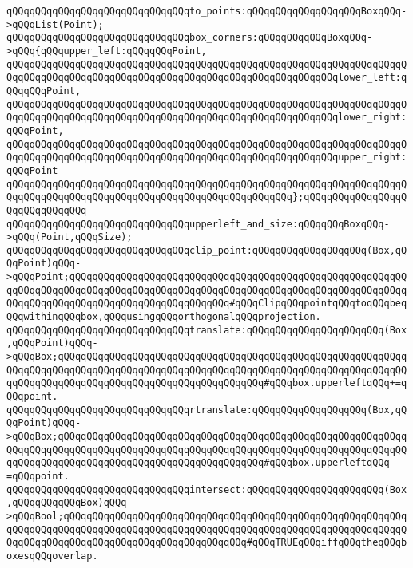 \verb|qQQqqQQqqQQqqQQqqQQqqQQqqQQqqQQqto_points:qQQqqQQqqQQqqQQqqQQqBoxqQQq->qQQqList(Point);|\newline
\verb|qQQqqQQqqQQqqQQqqQQqqQQqqQQqqQQqbox_corners:qQQqqQQqqQQqBoxqQQq->qQQq{qQQqupper_left:qQQqqQQqPoint,|\newline
\verb|qQQqqQQqqQQqqQQqqQQqqQQqqQQqqQQqqQQqqQQqqQQqqQQqqQQqqQQqqQQqqQQqqQQqqQQqqQQqqQQqqQQqqQQqqQQqqQQqqQQqqQQqqQQqqQQqqQQqqQQqqQQqqQQqlower_left:qQQqqQQqPoint,|\newline
\verb|qQQqqQQqqQQqqQQqqQQqqQQqqQQqqQQqqQQqqQQqqQQqqQQqqQQqqQQqqQQqqQQqqQQqqQQqqQQqqQQqqQQqqQQqqQQqqQQqqQQqqQQqqQQqqQQqqQQqqQQqqQQqqQQqlower_right:qQQqPoint,|\newline
\verb|qQQqqQQqqQQqqQQqqQQqqQQqqQQqqQQqqQQqqQQqqQQqqQQqqQQqqQQqqQQqqQQqqQQqqQQqqQQqqQQqqQQqqQQqqQQqqQQqqQQqqQQqqQQqqQQqqQQqqQQqqQQqqQQqupper_right:qQQqPoint|\newline
\verb|qQQqqQQqqQQqqQQqqQQqqQQqqQQqqQQqqQQqqQQqqQQqqQQqqQQqqQQqqQQqqQQqqQQqqQQqqQQqqQQqqQQqqQQqqQQqqQQqqQQqqQQqqQQqqQQqqQQqqQQq};qQQqqQQqqQQqqQQqqQQqqQQqqQQqqQQq|\newline
\verb|qQQqqQQqqQQqqQQqqQQqqQQqqQQqqQQqupperleft_and_size:qQQqqQQqBoxqQQq->qQQq(Point,qQQqSize);|\newline
\newline
\verb|qQQqqQQqqQQqqQQqqQQqqQQqqQQqqQQqclip_point:qQQqqQQqqQQqqQQqqQQq(Box,qQQqPoint)qQQq->qQQqPoint;qQQqqQQqqQQqqQQqqQQqqQQqqQQqqQQqqQQqqQQqqQQqqQQqqQQqqQQqqQQqqQQqqQQqqQQqqQQqqQQqqQQqqQQqqQQqqQQqqQQqqQQqqQQqqQQqqQQqqQQqqQQqqQQqqQQqqQQqqQQqqQQqqQQqqQQqqQQqqQQqqQQqqQQq#qQQqClipqQQqpointqQQqtoqQQqbeqQQqwithinqQQqbox,qQQqusingqQQqorthogonalqQQqprojection.|\newline
\verb|qQQqqQQqqQQqqQQqqQQqqQQqqQQqqQQqtranslate:qQQqqQQqqQQqqQQqqQQqqQQq(Box,qQQqPoint)qQQq->qQQqBox;qQQqqQQqqQQqqQQqqQQqqQQqqQQqqQQqqQQqqQQqqQQqqQQqqQQqqQQqqQQqqQQqqQQqqQQqqQQqqQQqqQQqqQQqqQQqqQQqqQQqqQQqqQQqqQQqqQQqqQQqqQQqqQQqqQQqqQQqqQQqqQQqqQQqqQQqqQQqqQQqqQQqqQQqqQQqqQQq#qQQqbox.upperleftqQQq+=qQQqpoint.|\newline
\verb|qQQqqQQqqQQqqQQqqQQqqQQqqQQqqQQqrtranslate:qQQqqQQqqQQqqQQqqQQq(Box,qQQqPoint)qQQq->qQQqBox;qQQqqQQqqQQqqQQqqQQqqQQqqQQqqQQqqQQqqQQqqQQqqQQqqQQqqQQqqQQqqQQqqQQqqQQqqQQqqQQqqQQqqQQqqQQqqQQqqQQqqQQqqQQqqQQqqQQqqQQqqQQqqQQqqQQqqQQqqQQqqQQqqQQqqQQqqQQqqQQqqQQqqQQqqQQqqQQq#qQQqbox.upperleftqQQq-=qQQqpoint.|\newline
\verb|qQQqqQQqqQQqqQQqqQQqqQQqqQQqqQQqintersect:qQQqqQQqqQQqqQQqqQQqqQQq(Box,qQQqqQQqqQQqBox)qQQq->qQQqBool;qQQqqQQqqQQqqQQqqQQqqQQqqQQqqQQqqQQqqQQqqQQqqQQqqQQqqQQqqQQqqQQqqQQqqQQqqQQqqQQqqQQqqQQqqQQqqQQqqQQqqQQqqQQqqQQqqQQqqQQqqQQqqQQqqQQqqQQqqQQqqQQqqQQqqQQqqQQqqQQqqQQqqQQqqQQq#qQQqTRUEqQQqiffqQQqtheqQQqboxesqQQqoverlap.|\newline
